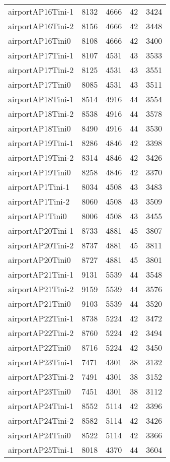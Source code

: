 \begin{longtable}{lrrrr}
airportAP16Tini-1 & 8132 & 4666 & 42 & 3424 \\
airportAP16Tini-2 & 8156 & 4666 & 42 & 3448 \\
airportAP16Tini0 & 8108 & 4666 & 42 & 3400 \\
airportAP17Tini-1 & 8107 & 4531 & 43 & 3533 \\
airportAP17Tini-2 & 8125 & 4531 & 43 & 3551 \\
airportAP17Tini0 & 8085 & 4531 & 43 & 3511 \\
airportAP18Tini-1 & 8514 & 4916 & 44 & 3554 \\
airportAP18Tini-2 & 8538 & 4916 & 44 & 3578 \\
airportAP18Tini0 & 8490 & 4916 & 44 & 3530 \\
airportAP19Tini-1 & 8286 & 4846 & 42 & 3398 \\
airportAP19Tini-2 & 8314 & 4846 & 42 & 3426 \\
airportAP19Tini0 & 8258 & 4846 & 42 & 3370 \\
airportAP1Tini-1 & 8034 & 4508 & 43 & 3483 \\
airportAP1Tini-2 & 8060 & 4508 & 43 & 3509 \\
airportAP1Tini0 & 8006 & 4508 & 43 & 3455 \\
airportAP20Tini-1 & 8733 & 4881 & 45 & 3807 \\
airportAP20Tini-2 & 8737 & 4881 & 45 & 3811 \\
airportAP20Tini0 & 8727 & 4881 & 45 & 3801 \\
airportAP21Tini-1 & 9131 & 5539 & 44 & 3548 \\
airportAP21Tini-2 & 9159 & 5539 & 44 & 3576 \\
airportAP21Tini0 & 9103 & 5539 & 44 & 3520 \\
airportAP22Tini-1 & 8738 & 5224 & 42 & 3472 \\
airportAP22Tini-2 & 8760 & 5224 & 42 & 3494 \\
airportAP22Tini0 & 8716 & 5224 & 42 & 3450 \\
airportAP23Tini-1 & 7471 & 4301 & 38 & 3132 \\
airportAP23Tini-2 & 7491 & 4301 & 38 & 3152 \\
airportAP23Tini0 & 7451 & 4301 & 38 & 3112 \\
airportAP24Tini-1 & 8552 & 5114 & 42 & 3396 \\
airportAP24Tini-2 & 8582 & 5114 & 42 & 3426 \\
airportAP24Tini0 & 8522 & 5114 & 42 & 3366 \\
airportAP25Tini-1 & 8018 & 4370 & 44 & 3604 \\

\end{longtable}
